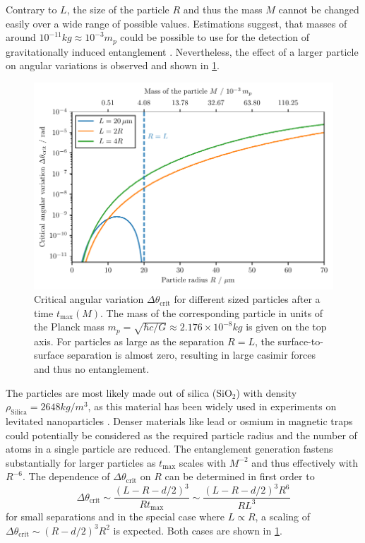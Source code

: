 Contrary to $L$, the size of the particle $R$ and thus the mass $M$ cannot be changed easily over a wide range of possible values.
Estimations suggest, that masses of around $10^{-11}\si{kg} \approx 10^{-3}m_p$ could be possible to use for the detection of gravitationally induced entanglement \cite[Timestamp 51:00]{Aspelmeyer_2024}.
Nevertheless, the effect of a larger particle on angular variations is observed and shown in \cref{fig:4:theta-crit-mass}.
\begin{figure}[!htbp]
  \centering
  \includegraphics[width=\textwidth]{./../figures/theta-variance/theta-crit-mass.pdf}
  \caption{Critical angular variation $\Delta \theta_\mathrm{crit}$ for different sized particles after a time $t_\mathrm{max}(M)$. The mass of the corresponding particle in units of the Planck mass $m_p = \sqrt{\hbar c / G} \approx 2.176\times 10^{-8}\si{kg}$ is given on the top axis. For particles as large as the separation $R = L$, the surface-to-surface separation is almost zero, resulting in large casimir forces and thus no entanglement.}
  \label{fig:4:theta-crit-mass}
\end{figure}
The particles are most likely made out of silica ($\mathrm{SiO_2}$) with density $\rho_\mathrm{Silica} = 2648\si{kg/m^3}$, as this material has been widely used in experiments on levitated nanoparticles \cite{Grass_2016,Slezak_2018}.
Denser materials like lead or osmium \cite{Krisnanda_2020} in magnetic traps could potentially be considered as the required particle radius and the number of atoms in a single particle are reduced.
The entanglement generation fastens substantially for larger particles as $t_\mathrm{max}$ scales with $M^{-2}$ and thus effectively with $R^{-6}$.
The dependence of $\Delta \theta_\mathrm{crit}$ on $R$ can be determined in first order to
\begin{equation}
  \Delta \theta_\mathrm{crit} \sim \frac{(L - R - d/2)^3}{R t_\mathrm{max}} \sim \frac{(L - R - d/2)^3 R^6}{R L^3 }
\end{equation}
for small separations and in the special case where $L \propto R$, a scaling of $\Delta \theta_\mathrm{crit} \sim (R - d/2)^3 R^2$ is expected.
Both cases are shown in \cref{fig:4:theta-crit-mass}.

